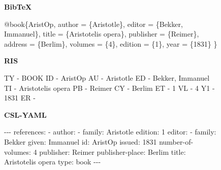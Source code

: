\documentclass[
  12pt,
  a4paper,
  oneside,
  titlepage,
  toclink=all,
  toc=bibliography]{scrbook}
\newenvironment{Shaded}{\begin{snugshade}}{\end{snugshade}}
\newcommand{\AttributeTok}[1]{\textcolor[rgb]{0.40,0.45,0.13}{#1}}
\newcommand{\DataTypeTok}[1]{\textcolor[rgb]{0.68,0.00,0.00}{#1}}
\newcommand{\DecValTok}[1]{\textcolor[rgb]{0.68,0.00,0.00}{#1}}
\newcommand{\FunctionTok}[1]{\textcolor[rgb]{0.28,0.35,0.67}{#1}}
\newcommand{\KeywordTok}[1]{\textcolor[rgb]{0.00,0.23,0.31}{#1}}
\newcommand{\NormalTok}[1]{\textcolor[rgb]{0.00,0.23,0.31}{#1}}
\newcommand{\OtherTok}[1]{\textcolor[rgb]{0.00,0.23,0.31}{#1}}
\newcommand{\PreprocessorTok}[1]{\textcolor[rgb]{0.68,0.00,0.00}{#1}}
\newcommand{\VariableTok}[1]{\textcolor[rgb]{0.07,0.07,0.07}{#1}}
\theoremstyle{definition}
\theoremstyle{plain}
\theoremstyle{plain}
\theoremstyle{plain}
\theoremstyle{plain}
\theoremstyle{definition}
\theoremstyle{definition}
\theoremstyle{plain}
\theoremstyle{remark}
\begin{document}
\hypertarget{scriv55}{}
\begin{figure}

\leavevmode{}%
\textbf{BibTeX}

\begin{Shaded}
\begin{Highlighting}[numbers=left,,]
\VariableTok{@book}\NormalTok{\{}\OtherTok{AristOp}\NormalTok{,}
\DataTypeTok{author}\NormalTok{ = \{Aristotle\},}
\DataTypeTok{editor}\NormalTok{ = \{Bekker, Immanuel\},}
\DataTypeTok{title}\NormalTok{ = \{Aristotelis opera\},}
\DataTypeTok{publisher}\NormalTok{ = \{Reimer\},}
\DataTypeTok{address}\NormalTok{ = \{Berlim\},}
\DataTypeTok{volumes}\NormalTok{ = \{4\},}
\DataTypeTok{edition}\NormalTok{ = \{1\},}
\DataTypeTok{year}\NormalTok{ = \{1831\}}
\NormalTok{\}}
\end{Highlighting}
\end{Shaded}

\textbf{RIS}

\begin{Shaded}
\begin{Highlighting}[numbers=left,,]
\NormalTok{TY  {-} BOOK}
\NormalTok{ID  {-} AristOp}
\NormalTok{AU  {-} Aristotle}
\NormalTok{ED  {-} Bekker, Immanuel}
\NormalTok{TI  {-} Aristotelis opera}
\NormalTok{PB  {-} Reimer}
\NormalTok{CY  {-} Berlim}
\NormalTok{ET  {-} 1}
\NormalTok{VL  {-} 4}
\NormalTok{Y1  {-} 1831}
\NormalTok{ER  {-}}
\end{Highlighting}
\end{Shaded}

\hypertarget{second-column}{}

\leavevmode{}%
\textbf{CSL-YAML}

\begin{Shaded}
\begin{Highlighting}[numbers=left,,]
\PreprocessorTok{{-}{-}{-}}
\FunctionTok{references}\KeywordTok{:}
\KeywordTok{{-}}\AttributeTok{ }\FunctionTok{author}\KeywordTok{:}
\AttributeTok{  }\KeywordTok{{-}}\AttributeTok{ }\FunctionTok{family}\KeywordTok{:}\AttributeTok{ Aristotle}
\AttributeTok{  }\FunctionTok{edition}\KeywordTok{:}\AttributeTok{ }\DecValTok{1}
\AttributeTok{  }\FunctionTok{editor}\KeywordTok{:}
\AttributeTok{  }\KeywordTok{{-}}\AttributeTok{ }\FunctionTok{family}\KeywordTok{:}\AttributeTok{ Bekker}
\AttributeTok{    }\FunctionTok{given}\KeywordTok{:}\AttributeTok{ Immanuel}
\AttributeTok{  }\FunctionTok{id}\KeywordTok{:}\AttributeTok{ AristOp}
\AttributeTok{  }\FunctionTok{issued}\KeywordTok{:}\AttributeTok{ }\DecValTok{1831}
\AttributeTok{  }\FunctionTok{number{-}of{-}volumes}\KeywordTok{:}\AttributeTok{ }\DecValTok{4}
\AttributeTok{  }\FunctionTok{publisher}\KeywordTok{:}\AttributeTok{ Reimer}
\AttributeTok{  }\FunctionTok{publisher{-}place}\KeywordTok{:}\AttributeTok{ Berlim}
\AttributeTok{  }\FunctionTok{title}\KeywordTok{:}\AttributeTok{ Aristotelis opera}
\AttributeTok{  }\FunctionTok{type}\KeywordTok{:}\AttributeTok{ book}
\PreprocessorTok{{-}{-}{-}}
\end{Highlighting}
\end{Shaded}


\end{figure}
\end{document}

